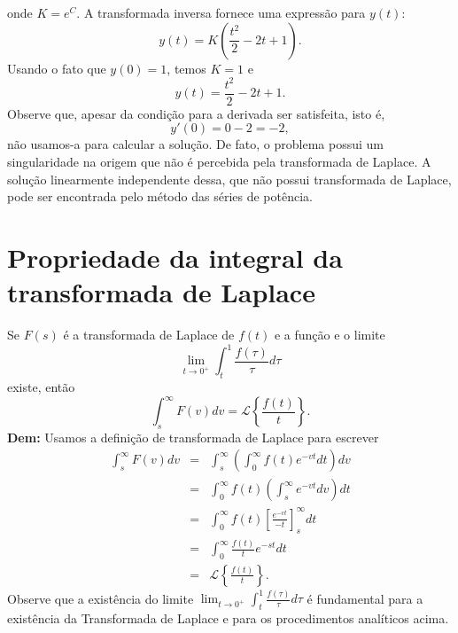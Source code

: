 \documentclass[a4paper,10pt]{book}
\begin{document}
 onde $K=e^C$. A transformada inversa fornece uma expressão para $y(t)$:
 \begin{equation}
 y(t)=K\left(\frac{t^2}{2}-2t+1\right).
 \end{equation}
 Usando o fato que $y(0)=1$, temos $K=1$ e
 \begin{equation}
 y(t)=\frac{t^2}{2}-2t+1.
 \end{equation}
 Observe que, apesar da condição para a derivada ser satisfeita, isto é,
 \begin{equation}
 y'(0)=0-2=-2,
 \end{equation}
 não usamos-a para calcular a solução. De fato, o problema possui um singularidade na origem que não é percebida pela transformada de Laplace. A solução linearmente independente dessa, que não possui transformada de Laplace, pode ser encontrada pelo método das séries de potência.


\section{Propriedade da integral da transformada de Laplace}
 Se $F(s)$ é a transformada de Laplace de $f(t)$ e a função
e o limite
\begin{equation}
\lim_{t\to 0^+}\int_{t}^1\frac{f(\tau)}{\tau}d\tau
\end{equation}
existe, então
\begin{equation}
\int_s^\infty F(v)dv =\mathcal{L}\left\{\frac{f(t)}{t}\right\}.
\end{equation}
{\bf Dem:} Usamos a definição de transformada de Laplace para escrever
\begin{eqnarray*}
\int_s^\infty F(v)dv&=&\int_s^\infty\left(\int_0^\infty f(t)e^{-vt}dt\right)dv\\
&=&\int_0^\infty f(t)\left(\int_s^\infty e^{-vt} dv \right)dt\\
&=&\int_0^\infty f(t)\left[\frac{ e^{-vt}}{-t} \right]_s^\infty dt\\
&=&\int_0^\infty \frac{f(t)}{t} e^{-st}  dt\\
&=&\mathcal{L}\left\{ \frac{f(t)}{t} \right\}.
\end{eqnarray*}
Observe que a existência do limite $\lim_{t\to 0^+}\int_{t}^1\frac{f(\tau)}{\tau}d\tau$ é fundamental para a existência da Transformada de Laplace e para os procedimentos analíticos acima.
\end{document}
